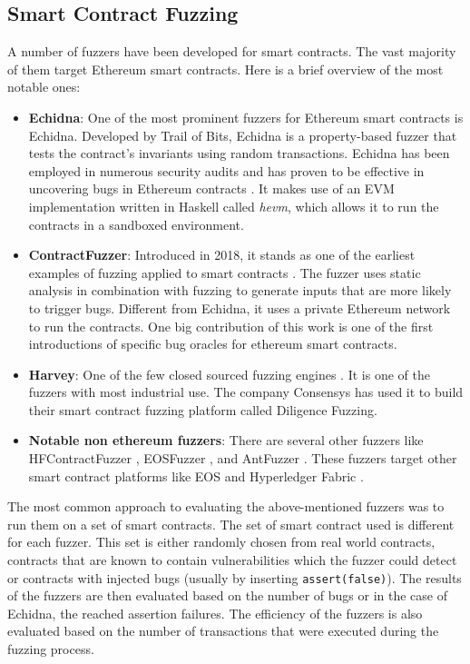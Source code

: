 \subsection*{Smart Contract Fuzzing}
A number of fuzzers have been developed for smart contracts.
The vast majority of them target Ethereum smart contracts.
Here is a brief overview of the most notable ones:
\begin{itemize}
    \item \textbf{Echidna}: One of the most prominent fuzzers for Ethereum smart contracts is Echidna. Developed by Trail of Bits, Echidna is a property-based fuzzer that tests the contract's invariants using random transactions.
          Echidna has been employed in numerous security audits and has proven to be effective in uncovering bugs in Ethereum contracts \cite{grieco_echidna_2020}.
          It makes use of an EVM implementation written in Haskell called \textit{hevm}, which allows it to run the contracts in a sandboxed environment.

    \item \textbf{ContractFuzzer}: Introduced in 2018, it stands as one of the earliest examples of fuzzing applied to smart contracts \cite{jiang_contractfuzzer_2018}.
          The fuzzer uses static analysis in combination with fuzzing to generate inputs that are more likely to trigger bugs.
          Different from Echidna, it uses a private Ethereum network to run the contracts.
          One big contribution of this work is one of the first introductions of specific bug oracles for ethereum smart contracts.
    \item \textbf{Harvey}: One of the few closed sourced fuzzing engines \cite{wustholz_harvey_2020}.
          It is one of the fuzzers with most industrial use.
          The company Consensys has used it to build their smart contract fuzzing platform called Diligence Fuzzing.
    \item \textbf{Notable non ethereum fuzzers}: There are several other fuzzers like HFContractFuzzer \cite{ding_hfcontractfuzzer_2021}, EOSFuzzer \cite{huang_eosfuzzer_2021}, and AntFuzzer \cite{zhou_antfuzzer_2022}.
          These fuzzers target other smart contract platforms like EOS \cite{noauthor_home_nodate} and Hyperledger Fabric \cite{noauthor_hyperledger_nodate}.

\end{itemize}

The most common approach to evaluating the above-mentioned fuzzers was to run them on a set of smart contracts.
The set of smart contract used is different for each fuzzer.
This set is either randomly chosen from real world contracts, contracts that are known to contain vulnerabilities which the fuzzer could detect or contracts with injected bugs (usually by inserting \texttt{assert(false)}).
The results of the fuzzers are then evaluated based on the number of bugs or in the case of Echidna, the reached assertion failures.
The efficiency of the fuzzers is also evaluated based on the number of transactions that were executed during the fuzzing process.

